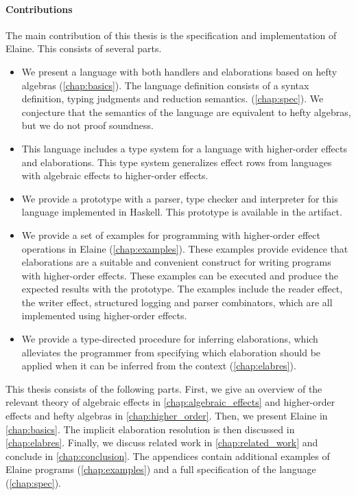 \paragraph{Contributions} The main contribution of this thesis is the specification and implementation of Elaine. This consists of several parts.
\begin{itemize}
    \item We present a language with both handlers and elaborations based on hefty algebras (\cref{chap:basics}). The language definition consists of a syntax definition, typing judgments and reduction semantics. (\cref{chap:spec}). We conjecture that the semantics of the language are equivalent to hefty algebras, but we do not proof soundness.
    \item This language includes a type system for a language with higher-order effects and elaborations. This type system generalizes effect rows from languages with algebraic effects to higher-order effects.
    \item We provide a prototype with a parser, type checker and interpreter for this language implemented in Haskell. This prototype is available in the artifact.
    \item We provide a set of examples for programming with higher-order effect operations in Elaine (\cref{chap:examples}). These examples provide evidence that elaborations are a suitable and convenient construct for writing programs with higher-order effects. These examples can be executed and produce the expected results with the prototype. The examples include the reader effect, the writer effect, structured logging and parser combinators, which are all implemented using higher-order effects.
    \item We provide a type-directed procedure for inferring elaborations, which alleviates the programmer from specifying which elaboration should be applied when it can be inferred from the context (\cref{chap:elabres}).
\end{itemize}
%
This thesis consists of the following parts. First, we give an overview of the relevant theory of algebraic effects in \cref{chap:algebraic_effects} and higher-order effects and hefty algebras in \cref{chap:higher_order}. Then, we present Elaine in \cref{chap:basics}. The implicit elaboration resolution is then discussed in \cref{chap:elabres}. Finally, we discuss related work in \cref{chap:related_work} and conclude in \cref{chap:conclusion}. The appendices contain additional examples of Elaine programs (\cref{chap:examples}) and a full specification of the language (\cref{chap:spec}).

